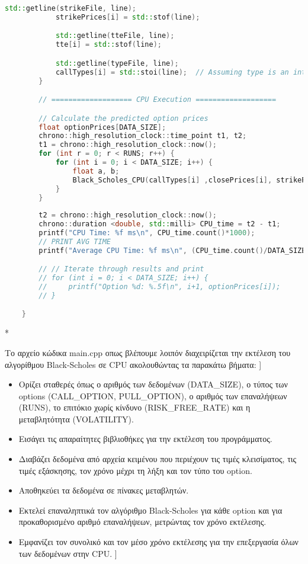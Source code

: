\begin{lstlisting}[language=C++, caption={main.cpp}]
            std::getline(strikeFile, line);
            strikePrices[i] = std::stof(line);

            std::getline(tteFile, line);
            tte[i] = std::stof(line);

            std::getline(typeFile, line);
            callTypes[i] = std::stoi(line);  // Assuming type is an integer
        }

        // =================== CPU Execution ===================

        // Calculate the predicted option prices
        float optionPrices[DATA_SIZE];
        chrono::high_resolution_clock::time_point t1, t2;
        t1 = chrono::high_resolution_clock::now();
        for (int r = 0; r < RUNS; r++) {
            for (int i = 0; i < DATA_SIZE; i++) {
                float a, b;
                Black_Scholes_CPU(callTypes[i] ,closePrices[i], strikePrices[i], RISK_FREE_RATE, VOLATILITY, tte[i], &optionPrices[i]);
            }
        }
    
        t2 = chrono::high_resolution_clock::now();
        chrono::duration <double, std::milli> CPU_time = t2 - t1;
        printf("CPU Time: %f ms\n", CPU_time.count()*1000);
        // PRINT AVG TIME
        printf("Average CPU Time: %f ms\n", (CPU_time.count()/DATA_SIZE)*1000);

        // // Iterate through results and print
        // for (int i = 0; i < DATA_SIZE; i++) {
        //     printf("Option %d: %.5f\n", i+1, optionPrices[i]);
        // }

    }
\end{lstlisting}*

Το αρχείο κώδικα main.cpp οπως βλέπουμε λοιπόν διαχειρίζεται την εκτέλεση του αλγορίθμου Black-Scholes σε CPU ακολουθώντας τα παρακάτω βήματα:
]\begin{itemize}
    \item Ορίζει σταθερές όπως ο αριθμός των δεδομένων (DATA\_SIZE), ο τύπος των options (CALL\_OPTION, PULL\_OPTION), ο αριθμός των επαναλήψεων (RUNS),
    το επιτόκιο χωρίς κίνδυνο (RISK\_FREE\_RATE) και η μεταβλητότητα (VOLATILITY).
    \item Εισάγει τις απαραίτητες βιβλιοθήκες για την εκτέλεση του προγράμματος.
    \item Διαβάζει δεδομένα από αρχεία κειμένου που περιέχουν τις τιμές κλεισίματος, τις τιμές εξάσκησης, τον χρόνο μέχρι τη λήξη και τον τύπο του option.
    \item Αποθηκεύει τα δεδομένα σε πίνακες μεταβλητών.
    \item Εκτελεί επαναληπτικά τον αλγόριθμο Black-Scholes για κάθε option και για προκαθορισμένο αριθμό επαναλήψεων, μετρώντας τον χρόνο εκτέλεσης.
    \item Εμφανίζει τον συνολικό και τον μέσο χρόνο εκτέλεσης για την επεξεργασία όλων των δεδομένων στην CPU.
]\end{itemize}

